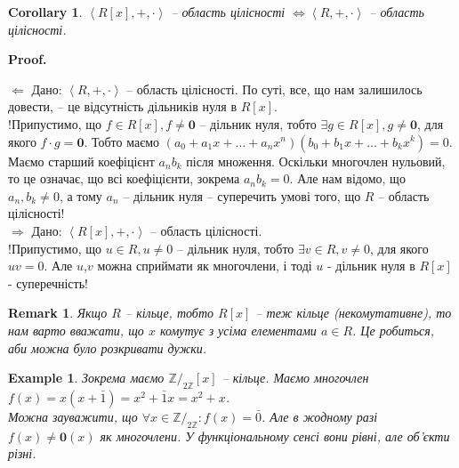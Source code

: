 \documentclass[a4paper, 10pt]{article}
\makeatletter
\def\rightproof{$\boxed{\Rightarrow}$ }
\def\leftproof{$\boxed{\Leftarrow}$ }
\theoremstyle{theoremdd}
\theoremstyle{theoremdd}
\theoremstyle{theoremdd}
\theoremstyle{theoremdd}
\theoremstyle{theoremdd}
\newtheorem{example}[theorem]{Example}
\theoremstyle{theoremdd}
\theoremstyle{theoremdd}
\theoremstyle{theoremdd}
\theoremstyle{theoremdd}
\theoremstyle{theoremdd}
\theoremstyle{theoremdd}
\newtheorem{remark}[theorem]{Remark}
\theoremstyle{theoremdd}
\theoremstyle{theoremdd}
\theoremstyle{theoremdd}
\newtheorem{corollary}[theorem]{Corollary}
\theoremstyle{theoremdd}
\renewenvironment{proof}[1][Proof.\\]{\par
\pushQED{\hfill \qed}%
\normalfont \topsep6\p@\@plus6\p@\relax
\trivlist
\item\relax
{\bfseries
#1\@addpunct{.}}\hspace\labelsep\ignorespaces
}{%
\popQED\endtrivlist\@endpefalse
}
\makeatother
\begin{document}
\begin{corollary}
$\left< R[x],+,\cdot\right>$ -- область цілісності $\iff \left< R,+,\cdot\right>$ -- область цілісності.
\end{corollary}

\begin{proof}
\leftproof Дано: $\left< R,+,\cdot\right>$ -- область цілісності. По суті, все, що нам залишилось довести, -- це відсутність дільників нуля в $R[x]$.\\
!Припустимо, що $f \in R[x], f \neq \textbf{0}$ -- дільник нуля, тобто $\exists g \in R[x], g \neq \textbf{0}$, для якого $f \cdot g = \textbf{0}$. Тобто маємо $(a_0+a_1 x + \dots + a_nx^n)(b_0 + b_1x + \dots + b_k x^k) = 0$. Маємо старший коефіцієнт $a_n b_k$ після множення. Оскільки многочлен нульовий, то це означає, що всі коефіцієнти, зокрема $a_n b_k = 0$. Але нам відомо, що $a_n,b_k \neq 0$, а тому $a_n$ -- дільник нуля -- суперечить умові того, що $R$ -- область цілісності!
\bigskip \\
\rightproof Дано: $\left< R[x], +, \cdot \right>$ -- область цілісності.\\
!Припустимо, що $u \in R, u \neq 0$ -- дільник нуля, тобто $\exists v \in R, v \neq 0$, для якого $uv = 0$. Але $u$,$v$ можна сприймати як многочлени, і тоді $u$ - дільник нуля в $R[x]$ - суперечність!
\end{proof}

\begin{remark}
Якщо $R$ -- кільце, тобто $R[x]$ -- теж кільце (некомутативне), то нам варто вважати, що $x$ комутує з усіма елементами $a \in R$. Це робиться, аби можна було розкривати дужки.
\end{remark}

\begin{example}
Зокрема маємо $\mathbb{Z}/_{2 \mathbb{Z}}[x]$ -- кільце. Маємо многочлен $f(x) = x(x+\bar{1}) = x^2 + \bar{1}x = x^2 + x$.\\
Можна зауважити, що $\forall x \in \mathbb{Z}/_{2 \mathbb{Z}}: f(x) = \bar{0}$. Але в жодному разі $f(x) \ne \textbf{0}(x)$ як многочлени. У функціональному сенсі вони рівні, але об'єкти різні.
\end{example}
\end{document}
